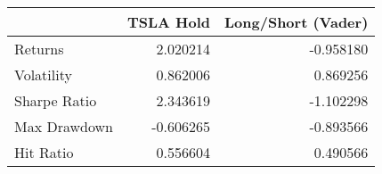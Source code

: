 \begin{tabular}{lrr}
\toprule
{} &  TSLA Hold &  Long/Short (Vader) \\
\midrule
Returns      &   2.020214 &           -0.958180 \\
Volatility   &   0.862006 &            0.869256 \\
Sharpe Ratio &   2.343619 &           -1.102298 \\
Max Drawdown &  -0.606265 &           -0.893566 \\
Hit Ratio    &   0.556604 &            0.490566 \\
\bottomrule
\end{tabular}
